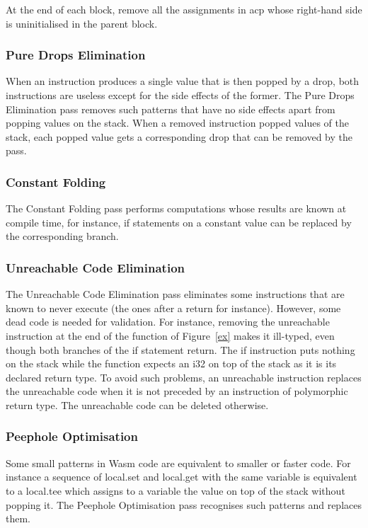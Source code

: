 \documentclass[a4paper,11pt]{article}
\begin{document}
At the end of each block, remove all the assignments in \textsf{acp} whose
right-hand side is uninitialised in the parent block.
\subsubsection{Pure Drops Elimination}
When an instruction produces a single value that is then popped by a
\textsf{drop}, both instructions are useless except for the side effects of the
former. The Pure Drops Elimination pass removes such patterns that have no side
effects apart from popping values on the stack. When a removed instruction
popped values of the stack, each popped value gets a corresponding \textsf{drop}
that can be removed by the pass.

\subsubsection{Constant Folding}
The Constant Folding pass performs computations whose results are known at
compile time, for instance, if statements on a constant value can be replaced
by the corresponding branch.

\subsubsection{Unreachable Code Elimination}
The Unreachable Code Elimination pass eliminates some instructions that are
known to never execute (the ones after a \textsf{return} for instance). However,
some dead code is needed for validation. For instance, removing the
\textsf{unreachable} instruction at the end of the function of Figure~\ref{ex}
makes it ill-typed, even though both branches of the if statement return. The
\textsf{if} instruction puts nothing on the stack while the function expects an
\textsf{i32} on top of the stack as it is its declared return type. To avoid
such problems, an \textsf{unreachable} instruction replaces the unreachable code
when it is not preceded by an instruction of polymorphic return type. The
unreachable code can be deleted otherwise.

\subsubsection{Peephole Optimisation}
Some small patterns in Wasm code are equivalent to smaller or faster code. For
instance a sequence of \textsf{local.set} and \textsf{local.get} with the same
variable is equivalent to a \textsf{local.tee} which assigns to a variable the
value on top of the stack without popping it. The Peephole Optimisation pass
recognises such patterns and replaces them.
\end{document}
